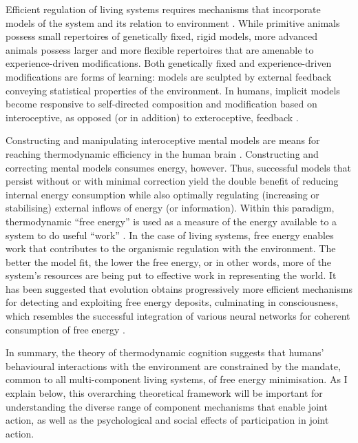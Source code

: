 \begin{CJK}{UTF8}{gbsn}
Efficient regulation of living systems requires mechanisms that incorporate models of the system and its relation to environment \citep{Conant1970}.  While primitive animals possess small repertoires of genetically fixed, rigid models, more advanced animals possess larger and more flexible repertoires that are amenable to experience-driven modifications.  Both genetically fixed and experience-driven modifications are forms of learning: models are sculpted by external feedback conveying statistical properties of the environment.  In humans, implicit models become responsive to self-directed composition and modification based on interoceptive, as opposed (or in addition) to exteroceptive, feedback \citep{Yufik1998}.

Constructing and manipulating interoceptive mental models are means for reaching thermodynamic efficiency in the human brain \citep{Yufik2013}. Constructing and correcting mental models consumes energy, however.  Thus, successful models that persist without or with minimal correction yield the double benefit of reducing internal energy consumption while also optimally regulating (increasing or stabilising) external inflows of energy (or information).  Within this paradigm, thermodynamic ``free energy'' is used as a measure of the energy available to a system to do useful ``work'' \citep{Stoner2000}.  In the case of living systems, free energy enables work that contributes to the organismic regulation with the environment. The better the model fit, the lower the free energy, or in other words, more of the system's resources are being put to effective work in representing the world.  It has been suggested that evolution obtains progressively more efficient mechanisms for detecting and exploiting free energy deposits, culminating in consciousness, which resembles the successful integration of various neural networks for coherent consumption of free energy \citep{Annila2016}.

In summary, the theory of thermodynamic cognition suggests that humans' behavioural interactions with the environment are constrained by the mandate, common to all multi-component living systems, of free energy minimisation.  As I explain below, this overarching theoretical framework will be important for understanding the diverse range of component mechanisms that enable joint action, as well as the psychological and social effects of participation in joint action.


\end{CJK}
